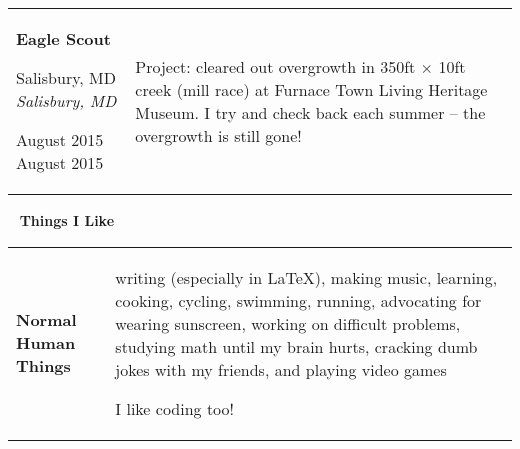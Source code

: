 \documentclass[11pt,letterpaper]{article}
\newcommand{\sect}[1]{
\begin{center}
	\noindent\xrfill[0.7ex]{0.5pt} \mbox{ } {\Large \bf #1} \mbox{ } \xrfill[0.7ex]{0.5pt}
\end{center}
}
\newcommand{\entry}[5]{
	\noindent
	\begin{tabular}{p{2in} p{\dimexpr \linewidth-2\tabcolsep-2.25in}} %
		\noindent \textbf{#1}
		
		\ifx #2  \else \noindent \textit{#2} \fi
		
		\ifx #3  \else \noindent \textit{#3} \fi
		
		\ifx #4  \else \noindent #4 \fi
		&
		#5
	\end{tabular}
	\vspace{0.5cm}
}
\begin{document}
	\entry{Eagle Scout}{}{Salisbury, MD}{August 2015}{
		Project: cleared out overgrowth in 350ft \(\times\) 10ft creek (mill race) at Furnace Town Living Heritage Museum. I try and check back each summer -- the overgrowth is still gone!
	}
	
	\sect{Things I Like}
	
	\entry{Normal Human Things}{}{}{}{
		writing (especially in \LaTeX), making music, learning, cooking, cycling, swimming, running, advocating for wearing sunscreen, working on difficult problems, studying math until my brain hurts, cracking dumb jokes with my friends, and playing video games
		
		I like coding too!
	}
\end{document}
